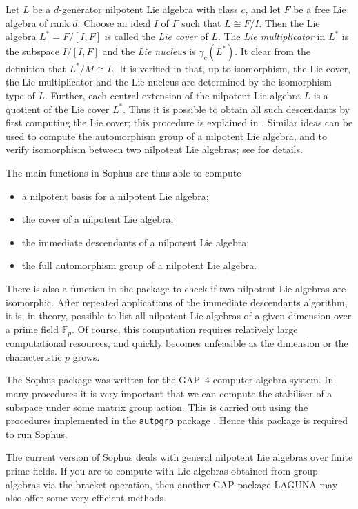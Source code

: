 \documentclass[11pt]{report}
\begin{document}
{Let $L$ be a $d$-generator nilpotent Lie algebra with class $c$, and let $F$ be a free Lie algebra of rank $d$. Choose an ideal $I$ of $F$ such that $L\cong F/I$. Then the Lie algebra $L^*=F/[I,F]$ is called the \emph{Lie cover} of $L$. The \emph{Lie multiplicator} in $L^*$ is the subspace $I/[I,F]$ and the \emph{Lie nucleus} is $\gamma_c(L^*)$. It clear from the definition that $L^*/M\cong L$. It is verified in \cite{Sch} that, up to isomorphism, the Lie cover, the Lie multiplicator and the Lie
nucleus are determined by the isomorphism type of $L$. Further, each central extension of the nilpotent Lie algebra $L$ is a quotient of the Lie cover $L^*$. Thus it is possible to obtain all such descendants by first computing the
Lie cover; this procedure is explained in \cite{Sch}. Similar ideas can be used to compute the automorphism group of a nilpotent
Lie algebra, and to verify isomorphism between two nilpotent Lie algebras; see \cite{Sch} for details. 

The main functions in \textsf{Sophus} are thus able to compute 
\begin{itemize}
\item  a nilpotent basis for a nilpotent Lie algebra;
\item  the cover of a nilpotent Lie algebra;
\item  the immediate descendants of a nilpotent Lie algebra;
\item  the full automorphism group of a nilpotent Lie algebra.
\end{itemize}
 There is also a function in the package to check if two nilpotent Lie algebras
are isomorphic. After repeated applications of the immediate descendants
algorithm, it is, in theory, possible to list all nilpotent Lie algebras of a
given dimension over a prime field $\mathbb F_p$. Of course, this computation requires relatively large computational
resources, and quickly becomes unfeasible as the dimension or the
characteristic $p$ grows. 

 The \textsf{Sophus} package was written for the GAP~4 computer algebra system. In many procedures
it is very important that we can compute the stabiliser of a subspace under
some matrix group action. This is carried out using the procedures implemented
in the \mbox{\texttt{autpgrp}} package \cite{autpgrp}. Hence this package is required to run \textsf{Sophus}. 

 The current version of \textsf{Sophus} deals with general nilpotent Lie algebras over finite prime fields. If you are
to compute with Lie algebras obtained from group algebras via the bracket
operation, then another GAP package LAGUNA \cite{Laguna} may also offer some very efficient methods. }
\end{document}
